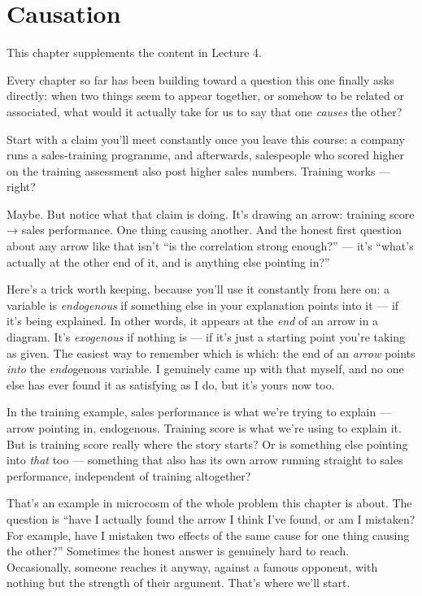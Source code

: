 \documentclass[
]{book}
\begin{document}
\chapter{Causation}\label{causation}

This chapter supplements the content in Lecture 4.

Every chapter so far has been building toward a question this one finally asks directly: when two things seem to appear together, or somehow to be related or associated, what would it actually take for us to say that one \emph{causes} the other?

Start with a claim you'll meet constantly once you leave this course: a company runs a sales-training programme, and afterwards, salespeople who scored higher on the training assessment also post higher sales numbers. Training works --- right?

Maybe. But notice what that claim is doing. It's drawing an arrow: training score → sales performance. One thing causing another. And the honest first question about any arrow like that isn't ``is the correlation strong enough?'' --- it's ``what's actually at the other end of it, and is anything else pointing in?''

Here's a trick worth keeping, because you'll use it constantly from here on: a variable is \emph{endogenous} if something else in your explanation points into it --- if it's being explained. In other words, it appears at the \emph{end} of an arrow in a diagram. It's \emph{exogenous} if nothing is --- if it's just a starting point you're taking as given. The easiest way to remember which is which: the end of an \emph{arrow} points \emph{into} the \emph{endo}genous variable. I genuinely came up with that myself, and no one else has ever found it as satisfying as I do, but it's yours now too.

In the training example, sales performance is what we're trying to explain --- arrow pointing in, endogenous. Training score is what we're using to explain it. But is training score really where the story starts? Or is something else pointing into \emph{that} too --- something that also has its own arrow running straight to sales performance, independent of training altogether?

That's an example in microcosm of the whole problem this chapter is about. The question is ``have I actually found the arrow I think I've found, or am I mistaken? For example, have I mistaken two effects of the same cause for one thing causing the other?'' Sometimes the honest answer is genuinely hard to reach. Occasionally, someone reaches it anyway, against a famous opponent, with nothing but the strength of their argument. That's where we'll start.
\end{document}
